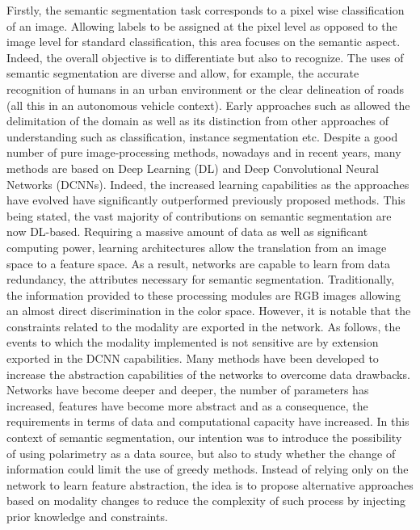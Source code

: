 Firstly, the semantic segmentation task corresponds to a pixel wise classification of an image. Allowing labels to be assigned at the pixel level as opposed to the image level for standard classification, this area focuses on the semantic aspect. Indeed, the overall objective is to differentiate but also to recognize. The uses of semantic segmentation are diverse and allow, for example, the accurate recognition of humans in an urban environment or the clear delineation of roads (all this in an autonomous vehicle context).
Early approaches such as \cite{ohta1978analysis} allowed the delimitation of the domain as well as its distinction from other approaches of understanding such as classification\cite{agin1980computer}, instance segmentation\cite{edelman1989integrating} etc. Despite a good number of pure image-processing methods, nowadays and in recent years, many methods are based on Deep Learning (DL) and Deep Convolutional Neural Networks (DCNNs). Indeed, the increased learning capabilities as the approaches have evolved have significantly outperformed previously proposed methods. This being stated, the vast majority of contributions on semantic segmentation are now DL-based. 
Requiring a massive amount of data as well as significant computing power, learning architectures allow the translation from an image space to a feature space. As a result, networks are capable to learn from data redundancy, the attributes necessary for semantic segmentation. Traditionally, the information provided to these processing modules are RGB images allowing an almost direct discrimination in the color space. However, it is notable that the constraints related to the modality are exported in the network. As follows, the events to which the modality implemented is not sensitive are by extension exported in the DCNN capabilities. 
Many methods have been developed to increase the abstraction capabilities of the networks to overcome data drawbacks. Networks have become deeper and deeper, the number of parameters has increased, features have become more abstract and as a consequence, the requirements in terms of data and computational capacity have increased.
In this context of semantic segmentation, our intention was to introduce the possibility of using polarimetry as a data source, but also to study whether the change of information could limit the use of greedy methods. Instead of relying only on the network to learn feature abstraction, the idea is to propose alternative approaches based on modality changes to reduce the complexity of such process by injecting prior knowledge and constraints.


